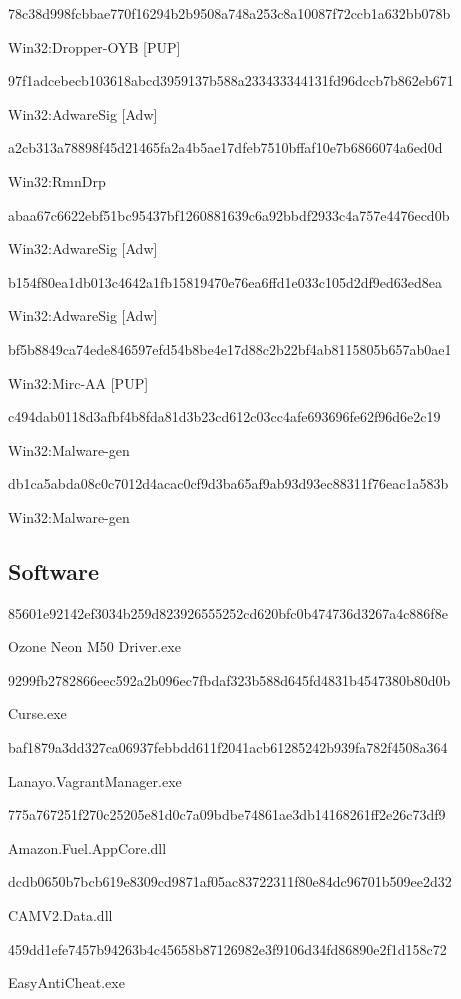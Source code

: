 \documentclass[czech,master,dept460,male,cpp,cpdeclaration]{diploma}
\begin{document}
\noindent
78c38d998fcbbae770f16294b2b9508a748a253c8a10087f72ccb1a632bb078b

Win32:Dropper-OYB [PUP]

\noindent
97f1adcebecb103618abcd3959137b588a233433344131fd96dccb7b862eb671

Win32:AdwareSig [Adw]

\noindent
a2cb313a78898f45d21465fa2a4b5ae17dfeb7510bffaf10e7b6866074a6ed0d

Win32:RmnDrp

\noindent
abaa67c6622ebf51bc95437bf1260881639c6a92bbdf2933c4a757e4476ecd0b

Win32:AdwareSig [Adw]

\noindent
b154f80ea1db013c4642a1fb15819470e76ea6ffd1e033c105d2df9ed63ed8ea

Win32:AdwareSig [Adw]

\noindent
bf5b8849ca74ede846597efd54b8be4e17d88c2b22bf4ab8115805b657ab0ae1

Win32:Mirc-AA [PUP]

\noindent
c494dab0118d3afbf4b8fda81d3b23cd612c03cc4afe693696fe62f96d6e2c19

Win32:Malware-gen

\noindent
db1ca5abda08c0c7012d4acac0cf9d3ba65af9ab93d93ec88311f76eac1a583b

Win32:Malware-gen

\subsection{Software}
85601e92142ef3034b259d823926555252cd620bfc0b474736d3267a4c886f8e

Ozone Neon M50 Driver.exe

\noindent
9299fb2782866eec592a2b096ec7fbdaf323b588d645fd4831b4547380b80d0b

Curse.exe

\noindent
baf1879a3dd327ca06937febbdd611f2041acb61285242b939fa782f4508a364

Lanayo.VagrantManager.exe

\noindent
775a767251f270c25205e81d0c7a09bdbe74861ae3db14168261ff2e26c73df9

Amazon.Fuel.AppCore.dll

\noindent
dcdb0650b7bcb619e8309cd9871af05ac83722311f80e84dc96701b509ee2d32

CAMV2.Data.dll

\noindent
459dd1efe7457b94263b4c45658b87126982e3f9106d34fd86890e2f1d158c72

EasyAntiCheat.exe
\end{document}
